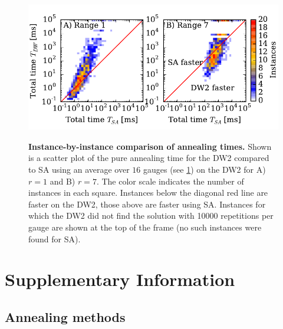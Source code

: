 \begin{figure}
\centering
\includegraphics[width=0.95\columnwidth]{chapters/Speedup/fig06.pdf}
\label{fig:ratiosannealing}
\caption{{\bf Instance-by-instance comparison of annealing times.} Shown is a scatter plot of the pure annealing time for the DW2 compared to SA using an average over $16$ gauges (see \ref{sec:supp}) on the DW2 for A) $r=1$ and B) $r=7$.  The color scale indicates the number of instances in each square. Instances below the diagonal red line are faster on the DW2, those above are faster using SA. Instances for which the DW2 did not find the solution with 10000 repetitions per gauge are shown at the top of the frame (no such instances were found for SA).
}
\end{figure}


\section{Supplementary Information}\label{sec:supp}



\subsection{Annealing methods}
